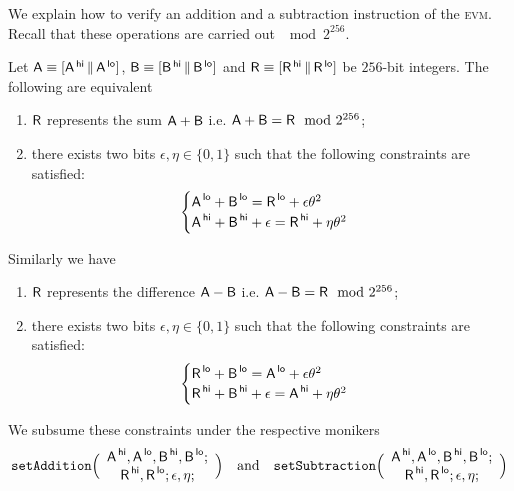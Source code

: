 We explain how to verify an addition and a subtraction instruction of the \textsc{evm}. Recall that these operations are carried out $\mod 2^{256}$.
\begin{lem}
Let
$\mathsf{A} \equiv [\mathsf{A}^{\mathsf{\,hi}} \,\|\, \mathsf{A}^{\mathsf{\,lo}}]$,
$\mathsf{B} \equiv [\mathsf{B}^{\mathsf{\,hi}} \,\|\, \mathsf{B}^{\mathsf{\,lo}}]$ and
$\mathsf{R} \equiv [\mathsf{R}^{\mathsf{\,hi}} \,\|\, \mathsf{R}^{\mathsf{\,lo}}]$
be $256$-bit integers. The following are equivalent
\begin{enumerate}
	\item $\mathsf{R}$ represents the sum $\textsf{A} + \textsf{B}$ i.e. $\textsf{A} + \textsf{B} = \textsf{R} \mod 2^{256}$;
	\item there exists two bits $\epsilon,\eta\in\{0,1\}$ such that the following constraints are satisfied:
	\[
	\begin{cases}
		\textsf{A}^{\mathsf{\,lo}} + \textsf{B}^{\mathsf{\,lo}} = \textsf{R}^{\mathsf{\,lo}} + \epsilon \theta^2 \\
		\textsf{A}^{\mathsf{\,hi}} + \textsf{B}^{\mathsf{\,hi}} + \epsilon = \textsf{R}^{\mathsf{\,hi}} + \eta \theta^2 \\
	\end{cases}
	\]
\end{enumerate}
Similarly we have
\begin{enumerate}
	\item $\mathsf{R}$ represents the difference $\textsf{A} - \textsf{B}$ i.e. $\textsf{A} - \textsf{B} = \textsf{R} \mod 2^{256}$;%
	\item there exists two bits $\epsilon,\eta\in\{0,1\}$ such that the following constraints are satisfied:
	\[
	\begin{cases}
		\textsf{R}^{\mathsf{\,lo}} + \textsf{B}^{\mathsf{\,lo}} = \textsf{A}^{\mathsf{\,lo}} + \epsilon \theta^2 \\
		\textsf{R}^{\mathsf{\,hi}} + \textsf{B}^{\mathsf{\,hi}} + \epsilon = \textsf{A}^{\mathsf{\,hi}} + \eta \theta^2 \\
	\end{cases}
	\]
\end{enumerate}
\end{lem}
We subsume these constraints under the respective monikers
\[
	\texttt{setAddition}\Big(
	\begin{array}{c}
	\textsf{A}^{\mathsf{\,hi}},
	\textsf{A}^{\mathsf{\,lo}},
	\textsf{B}^{\mathsf{\,hi}},
	\textsf{B}^{\mathsf{\,lo}}; \\
	\textsf{R}^{\mathsf{\,hi}}, \textsf{R}^{\mathsf{\,lo}};
	\epsilon,
	\eta;
	\end{array}
	\Big)
	\quad\text{and}\quad
	\texttt{setSubtraction}\Big(
	\begin{array}{c}
	\textsf{A}^{\mathsf{\,hi}},
	\textsf{A}^{\mathsf{\,lo}},
	\textsf{B}^{\mathsf{\,hi}},
	\textsf{B}^{\mathsf{\,lo}}; \\
	\textsf{R}^{\mathsf{\,hi}}, \textsf{R}^{\mathsf{\,lo}};
	\epsilon,
	\eta;
	\end{array}
	\Big)
\]

